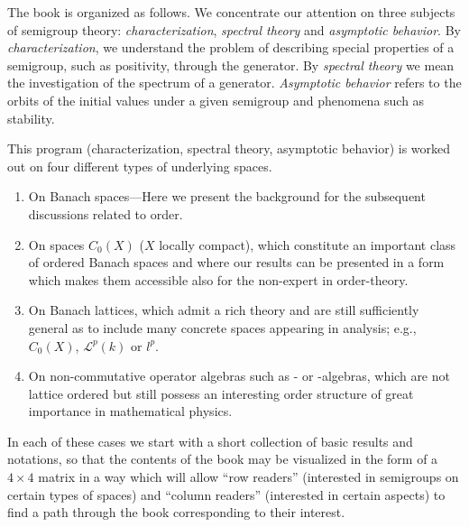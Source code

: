 The book is organized as follows.
We concentrate our attention on three subjects of semigroup theory: \emph{characterization}, \emph{spectral theory} and \emph{asymptotic behavior}. 
By \emph{characterization}, we understand the problem of describing special properties of a semigroup, such as positivity, through the generator. 
By \emph{spectral theory} we mean the investigation of the spectrum of a generator. 
\emph{Asymptotic behavior} refers to the orbits of the initial values under a given semigroup and phenomena such as stability.

This program (characterization, spectral theory, asymptotic behavior) is worked out on four different types of underlying spaces.
\newpage
\begin{enumerate}[label=(\Alph*)]
\item 
On Banach spaces---Here we present the background for the subsequent discussions related to order.

\item 
On spaces $C_{0}(X)$ ($X$ locally compact), which constitute an important class of ordered Banach spaces and where our results can be presented in a form which makes them accessible also for the non-expert in order-theory.

\item 
On Banach lattices, which admit a rich theory and are still sufficiently general as to include many concrete spaces appearing in analysis; e.g., $C_0(X)$, $\mathcal{L}^p(k)$ or $l^p$.

\item 
On non-commutative operator algebras such as \CA- or \WA-algebras, which are not lattice ordered but still possess an interesting order structure of great importance in mathematical physics.

\end{enumerate}
In each of these cases we start with a short collection of basic results and notations, so that the contents of the book may be visualized in the form of a $4 \times 4$ matrix in a way which will allow \enquote{row readers} (interested in semigroups on certain types of spaces) and \enquote{column readers} (interested in certain aspects) to find a path through the book corresponding to their interest.

